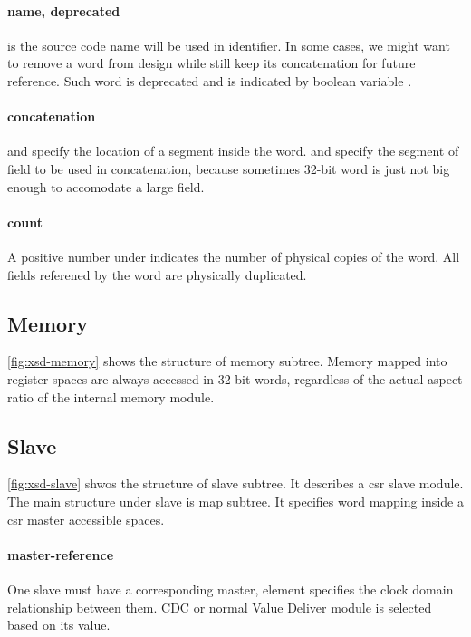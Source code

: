 \documentclass[10pt,oneside]{book}
\begin{document}
\paragraph{name, deprecated} 
 is the 
source code name will be used in identifier. In some cases, 
we might want to remove a \gls{word} from design while still keep 
its concatenation for future reference. 
Such word is deprecated and is indicated by boolean variable
. 




\paragraph{concatenation}
 and 
specify the location of a segment inside the \gls{word}.
and  specify the segment of field
to be used in concatenation, because sometimes 32-bit word is just not big enough
to accomodate a large \gls*{field}. 
\paragraph{count}
A positive number under  indicates 
the number of physical copies of the word. All fields referened 
by the word are physically duplicated. 


\subsection{Memory}
\autoref{fig:xsd-memory} shows the structure of memory subtree. 
Memory mapped into register spaces are always accessed in 32-bit words, 
regardless of the actual aspect ratio of the internal memory module. 

\subsection{Slave}
\autoref{fig:xsd-slave} shwos the structure of slave subtree. It describes 
a \gls{csr slave} module. The main structure under slave is map subtree. 
It specifies \gls{word} mapping inside a \gls{csr master} accessible 
spaces.  

\paragraph{master-reference}
One slave must have a corresponding master, 
element specifies the clock domain relationship between them. 
CDC or normal Value Deliver module is selected based on its value. 
\end{document}
